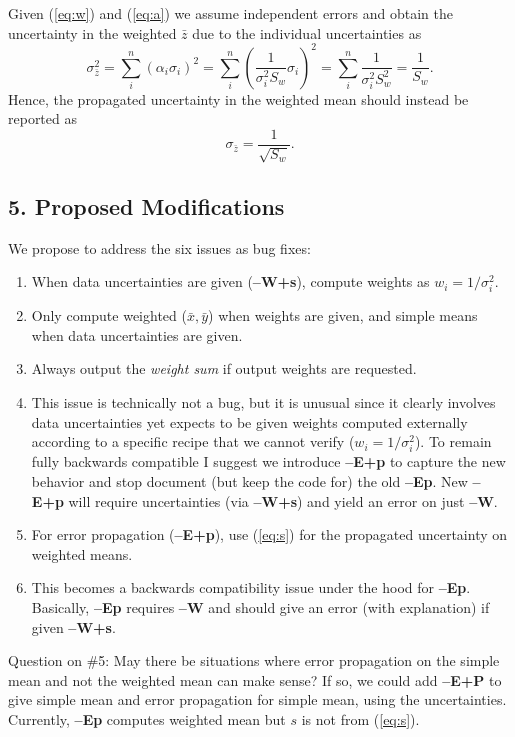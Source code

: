 \documentclass[12pt,letterpaper,margin=0.5in]{report}
\begin{document}
Given (\ref{eq:w}) and (\ref{eq:a}) we assume independent errors and obtain the uncertainty in the weighted $\bar{z}$ due to the individual uncertainties as
\begin{equation}
	\sigma_{\bar{z}}^2 = \sum_i^n \left (\alpha_i \sigma_i \right )^2 = \sum_i^n \left (\frac{1}{\sigma_i^2 S_w} \sigma_i \right )^2 = \sum_i^n \frac{1}{\sigma_i^2 S_w^2} = \frac{1}{S_w}.
	\label{eq:v}
\end{equation}
Hence, the propagated uncertainty in the weighted mean should instead be reported as
\begin{equation}
	\sigma_{\bar{z}} = \frac{1}{\sqrt{S_w}}.
	\label{eq:s}
\end{equation}

\subsection*{5. Proposed Modifications}

We propose to address the six issues as bug fixes:
\begin{enumerate}
	\item When data uncertainties are given ({\bf --W+s}), compute weights as $w_i = 1/\sigma_i^2$.
	\item Only compute weighted ($\bar{x}, \bar{y}$) when weights are given, and simple means when data uncertainties are given.
	\item Always output the \emph{weight sum} if output weights are requested.
	\item This issue is technically not a bug, but it is unusual since it clearly involves data uncertainties yet expects to be
		given weights computed externally according to a specific recipe that we cannot verify ($w_i = 1/\sigma_i^2$).  To remain fully backwards compatible I
		suggest we introduce {\bf --E+p} to capture the new behavior and stop document (but keep the code for) the old {\bf --Ep}.
		New {\bf --E+p} will require uncertainties (via {\bf --W+s}) and yield an error on just {\bf --W}.
	\item For error propagation ({\bf --E+p}), use (\ref{eq:s}) for the propagated uncertainty on weighted means.
	\item This becomes a backwards compatibility issue under the hood for {\bf --Ep}.  Basically, {\bf --Ep} requires {\bf --W} and should give
		an error (with explanation) if given {\bf --W+s}.
\end{enumerate}

Question on \#5: May there be situations where error propagation on the simple mean and not the weighted mean can make sense? If so, we could add
{\bf --E+P} to give simple mean and error propagation for simple mean, using the uncertainties. Currently, {\bf --Ep} computes weighted mean but $s$ is not from (\ref{eq:s}).
\end{document}
